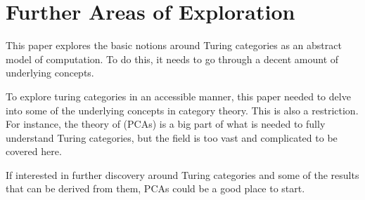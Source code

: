 \section{Further Areas of Exploration}

This paper explores the basic notions around Turing categories
as an abstract model of computation.
To do this, it needs to go through a decent amount of underlying
concepts.

To explore turing categories in an accessible manner,
this paper needed to delve into some of the underlying
concepts in category theory.
This is also a restriction. For instance,
the theory of  (PCAs)
is a big part of what is needed 
to fully understand Turing categories,
but the field is too vast and complicated to be covered here.

If interested in further discovery around Turing categories
and some of the results that can be derived from them,
PCAs could be a good place to start.


